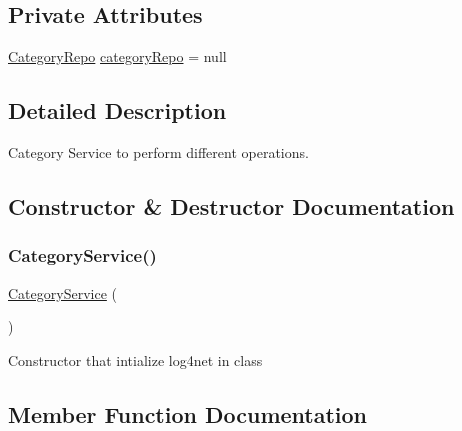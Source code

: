 \subsection*{Private Attributes}
\begin{DoxyCompactItemize}
\item 
\hyperlink{classWildLifeTracker_1_1Repository_1_1CategoryRepo}{Category\+Repo} \hyperlink{classWildLifeTracker_1_1CategoryService_afcd9096c0e690fe541d83bdadfe212fa}{category\+Repo} = null
\end{DoxyCompactItemize}


\subsection{Detailed Description}
Category Service to perform different operations. 



\subsection{Constructor \& Destructor Documentation}
\mbox{\label{classWildLifeTracker_1_1CategoryService_a722357258ec21820efef6f642906457c}} 
\subsubsection{\texorpdfstring{Category\+Service()}{CategoryService()}}
{\footnotesize\ttfamily \hyperlink{classWildLifeTracker_1_1CategoryService}{Category\+Service} (\begin{DoxyParamCaption}{ }\end{DoxyParamCaption})\hspace{0.3cm}{\ttfamily [inline]}}



Constructor that intialize log4net in class 



\subsection{Member Function Documentation}
\mbox{\label{classWildLifeTracker_1_1CategoryService_ab22f6cdfb39adc2607dc86cb100889fc}} 
